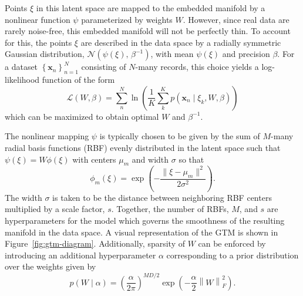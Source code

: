 Points $\xi$ in this latent space are mapped to the embedded manifold by a nonlinear function $\psi$ parameterized by weights $W$. However, since real data are rarely noise-free, this embedded manifold will not be perfectly thin. To account for this, the points $\xi$ are described in the data space by a radially symmetric Gaussian distribution, $\mathcal{N}(\psi(\xi),\, \beta^{-1})$, with mean $\psi(\xi)$ and precision $\beta$. For a dataset $\left\{ \mathbf{x}_n\right\}_{n=1}^N$ consisting of $N$-many records, this choice yields a log-likelihood function of the form
\begin{equation}\label{eq:llh}
    \mathcal{L}(W, \beta) = \sum_n^N \ln \left(\dfrac{1}{K}\sum_k^K p(\mathbf{x}_n \mid \xi_k, W, \beta) \right)
\end{equation}
which can be maximized to obtain optimal $W$ and $\beta^{-1}$.

The nonlinear mapping $\psi$ is typically chosen to be given by the sum of $M$-many radial basis functions (RBF) evenly distributed in the latent space such that $\psi(\xi) = W\phi(\xi)$ with centers $\mu_m$ and width $\sigma$ so that
\begin{equation}
    \phi_m(\xi) = \exp\left(-\dfrac{\lVert \xi - \mu_m \rVert^2}{2\sigma^2}\right).
\end{equation}
The width $\sigma$ is taken to be the distance between neighboring RBF centers multiplied by a scale factor, $s$. Together, the number of RBFs, $M$, and $s$ are hyperparameters for the model which governs the smoothness of the resulting manifold in the data space. %
 A visual representation of the GTM is shown in Figure~\ref{fig:gtm-diagram}. Additionally, sparsity of $W$ can be enforced by introducing an additional hyperparameter $\alpha$ corresponding to a prior distribution over the weights given by
\begin{equation}\label{eq:weight-prior}
    p(W \mid \alpha) =  \left( \frac{\alpha}{2\pi} \right)^{MD/2}\exp\left(-\frac{\alpha}{2}\left\lVert W \right\rVert_{F}^2\right).
\end{equation}

